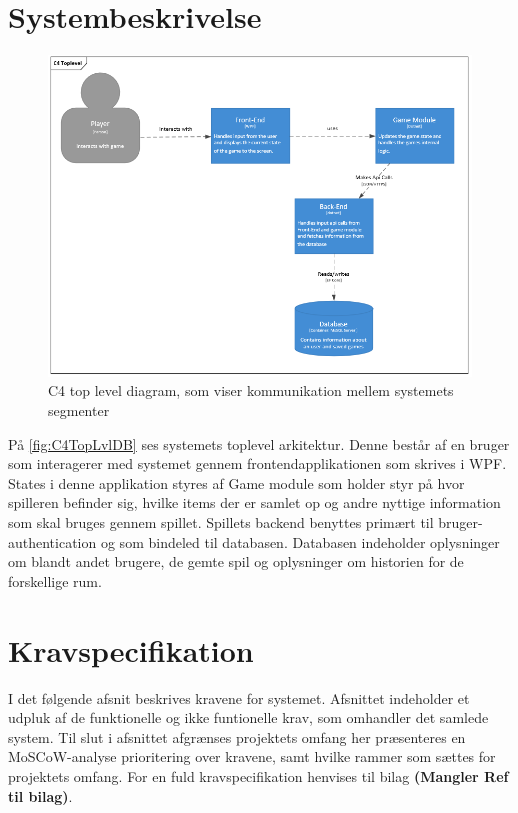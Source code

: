 \section{Systembeskrivelse}

\begin{figure}[H]
\centering
\includegraphics[width = \textwidth]{02-Body/Images/C4TopLvlDB}
\caption{C4 top level diagram, som viser kommunikation mellem systemets segmenter}
\label{fig:C4TopLvlDB}
\end{figure}

På \autoref{fig:C4TopLvlDB} ses systemets toplevel arkitektur.
Denne består af en bruger som interagerer med systemet gennem frontendapplikationen som skrives i WPF. States i denne applikation styres af Game module som holder styr på hvor spilleren befinder sig, hvilke items der er samlet op og andre nyttige information som skal bruges gennem spillet.
Spillets backend benyttes primært til bruger-authentication og som bindeled til databasen.
Databasen indeholder oplysninger om blandt andet brugere, de gemte spil og oplysninger om historien for de forskellige rum.

\newpage


\section{Kravspecifikation}
\label{sec:kravspec}

I det følgende afsnit beskrives kravene for systemet. Afsnittet indeholder et udpluk af de funktionelle og ikke funtionelle krav, som omhandler det samlede system. Til slut i afsnittet afgrænses projektets omfang her præsenteres en MoSCoW-analyse prioritering over kravene, samt hvilke rammer som sættes for projektets omfang. For en fuld kravspecifikation henvises til bilag \textbf{(Mangler Ref til bilag)}.\\  


